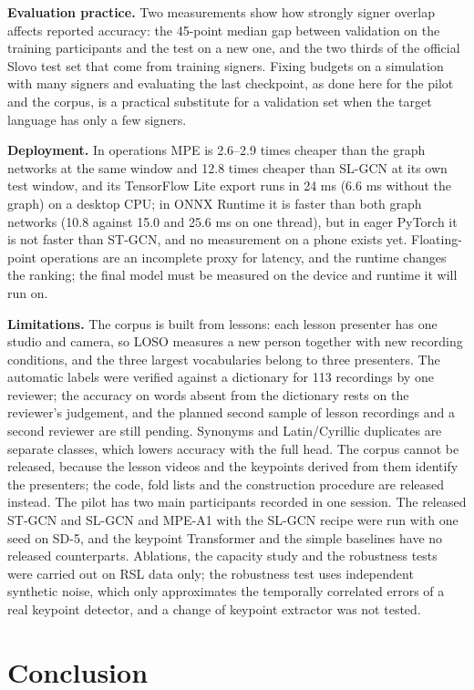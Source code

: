 \documentclass[a4paper,fleqn]{cas-dc}
\begin{document}
\textbf{Evaluation practice.} Two measurements show how strongly signer overlap affects reported accuracy: the 45-point median gap between validation on the training participants and the test on a new one, and the two thirds of the official Slovo test set that come from training signers. Fixing budgets on a simulation with many signers and evaluating the last checkpoint, as done here for the pilot and the corpus, is a practical substitute for a validation set when the target language has only a few signers.

\textbf{Deployment.} In operations MPE is 2.6--2.9 times cheaper than the graph networks at the same window and 12.8 times cheaper than SL-GCN at its own test window, and its TensorFlow Lite export runs in 24 ms (6.6 ms without the graph) on a desktop CPU; in ONNX Runtime it is faster than both graph networks (10.8 against 15.0 and 25.6 ms on one thread), but in eager PyTorch it is not faster than ST-GCN, and no measurement on a phone exists yet. Floating-point operations are an incomplete proxy for latency, and the runtime changes the ranking; the final model must be measured on the device and runtime it will run on.

\textbf{Limitations.} The corpus is built from lessons: each lesson presenter has one studio and camera, so LOSO measures a new person together with new recording conditions, and the three largest vocabularies belong to three presenters. The automatic labels were verified against a dictionary for 113 recordings by one reviewer; the accuracy on words absent from the dictionary rests on the reviewer's judgement, and the planned second sample of lesson recordings and a second reviewer are still pending. Synonyms and Latin/Cyrillic duplicates are separate classes, which lowers accuracy with the full head. The corpus cannot be released, because the lesson videos and the keypoints derived from them identify the presenters; the code, fold lists and the construction procedure are released instead. The pilot has two main participants recorded in one session. The released ST-GCN and SL-GCN and MPE-A1 with the SL-GCN recipe were run with one seed on SD-5, and the keypoint Transformer and the simple baselines have no released counterparts. Ablations, the capacity study and the robustness tests were carried out on RSL data only; the robustness test uses independent synthetic noise, which only approximates the temporally correlated errors of a real keypoint detector, and a change of keypoint extractor was not tested.

\hypertarget{conclusion}{%
\section{Conclusion}\label{conclusion}}
\end{document}
